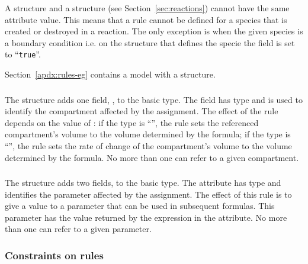 \documentclass[10pt,twocolumntoc]{cekarticle}
\begin{document}
A  structure and a
 structure (see
Section~\ref{sec:reactions}) cannot have the same 
attribute value.  This means that a rule cannot be defined for a
species that is created or destroyed in a reaction.  The only
exception is when the given species is a boundary condition i.e.
on the  structure that defines the specie the
 field is set to ``\texttt{true}''.

Section~\ref{apdx:rules-eg} contains a model with a
 structure.

\subsubsection{}

The  structure adds one field,
, to the basic  type.
The field  has type  and is used to
identify the compartment affected by the assignment.  The effect
of the rule depends on the value of : if the type is
``'', the rule sets the referenced compartment's
volume to the volume determined by the formula; if the type is
``'', the rule sets the rate of change of the
compartment's volume to the volume determined by the formula. No
more than one  can refer to a given
compartment.

\subsubsection{}

The  structure adds two fields,
 to the basic  type.  The
 attribute has type  and identifies
the parameter affected by the assignment. The effect of this rule
is to give a value to a parameter that can be used in subsequent
formulas.  This parameter has the value returned by the expression
in the  attribute. No more than one
 can refer to a given parameter.

\subsubsection{Constraints on rules}
\label{sec:ruleconstraints}
\end{document}
